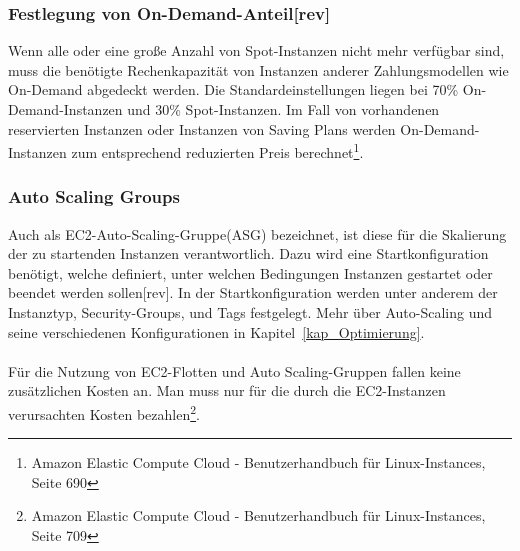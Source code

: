 \subsubsection*{Festlegung von On-Demand-Anteil[rev]}
Wenn alle oder eine große Anzahl von Spot-Instanzen nicht mehr verfügbar sind, muss die benötigte Rechenkapazität von Instanzen anderer Zahlungsmodellen wie On-Demand abgedeckt werden. Die Standardeinstellungen liegen bei 70\% On-Demand-Instanzen und 30\% Spot-Instanzen\cite{AMZ24}. Im Fall von vorhandenen reservierten Instanzen oder Instanzen von Saving Plans werden On-Demand-Instanzen zum entsprechend reduzierten Preis berechnet\footnote{\cite{AMZ26} Amazon Elastic Compute Cloud - Benutzerhandbuch für Linux-Instances, Seite 690}.

\subsubsection*{Auto Scaling Groups}%
Auch als EC2-Auto-Scaling-Gruppe(ASG) bezeichnet, ist diese für die Skalierung der zu startenden Instanzen verantwortlich. Dazu wird eine Startkonfiguration benötigt, welche definiert, unter welchen Bedingungen Instanzen gestartet oder beendet werden sollen[rev]. In der Startkonfiguration werden unter anderem der Instanztyp, Security-Groups, und Tags festgelegt. Mehr über Auto-Scaling und seine verschiedenen Konfigurationen in Kapitel~\ref{kap_Optimierung}.
\\\\
Für die Nutzung von EC2-Flotten und Auto Scaling-Gruppen fallen keine zusätzlichen Kosten an. Man muss nur für die durch die EC2-Instanzen verursachten Kosten bezahlen\footnote{\cite{AMZ26} Amazon Elastic Compute Cloud - Benutzerhandbuch für Linux-Instances, Seite 709}. 

